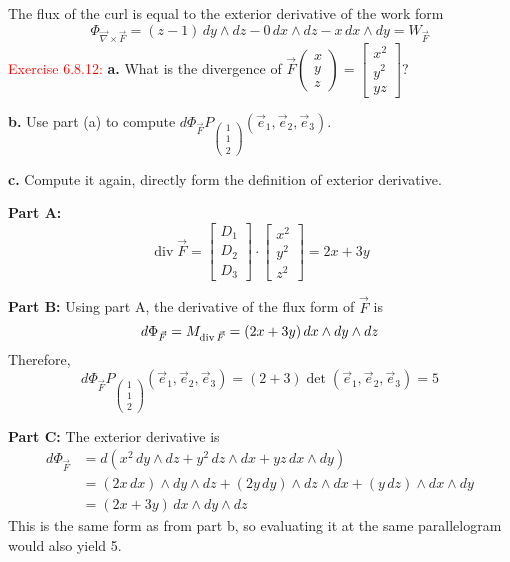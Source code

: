 \documentclass[12pt]{article}
\begin{document}
The flux of the curl is equal to the exterior derivative of the work form
\[
    \Phi_{\vec \nabla \times \vec F}
    = (z-1)\,dy \wedge dz - 0 \,dx \wedge dz - x\,dx \wedge dy
    = W_{\vec F}
\]
\textcolor{red}{Exercise 6.8.12:}
\textbf{a.} What is the divergence of
$\vec F \begin{pmatrix}
x\\y\\ z
\end{pmatrix} = \begin{bmatrix}
 x^2 \\ y^2 \\yz
\end{bmatrix}$?
\smallskip

\textbf{b.} Use part (a) to compute $d\Phi_{\vec F} P_{\begin{pmatrix}
1\\1\\2
\end{pmatrix}} (\vec e_1 , \vec e_2 , \vec e_3)$.

\textbf{c.} Compute it again, directly form the definition of exterior derivative.

\textbf{Part A: }
\[
    \operatorname{div} \vec F =
    \begin{bmatrix}
        D_1 \\ D_2 \\ D_3
    \end{bmatrix}
    \cdot 
    \begin{bmatrix}
        x^2 \\ y^2 \\ z^2
    \end{bmatrix} =
    2x + 3y 
\]

\textbf{Part B: }
Using part A, the derivative of the flux form of $\vec F$ is
\[
    d\Phi_{\vec F}
    = M_{\operatorname{div} \vec F} \\ 
    = (2x + 3y) \,dx \wedge dy \wedge dz
\]
Therefore,
\[
    d\Phi_{\vec F}P_{\begin{pmatrix}
        1\\1\\2
    \end{pmatrix}} (\vec e_1 , \vec e_2 , \vec e_3)
    = (2+3) \det(\vec e_1 , \vec e_2 , \vec e_3)
    = 5
\]

\textbf{Part C: }
The exterior derivative is
\begin{align*}
    d\Phi_{\vec F} 
    &= d(x^2 \,dy \wedge dz + y^2 \,dz \wedge dx + yz \,dx \wedge dy) \\
    &= (2x \,dx) \wedge dy \wedge dz + (2y \,dy) \wedge dz \wedge dx + (y \,dz) \wedge dx \wedge dy \\
    &= (2x+3y) \,dx \wedge dy \wedge dz
\end{align*}
This is the same form as from part b, so evaluating it at the same 
parallelogram would also yield 5.
\end{document}

